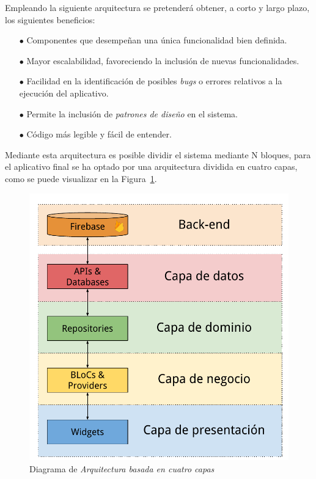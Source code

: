 Empleando la siguiente arquitectura se pretenderá obtener, a corto y largo plazo,  los siguientes beneficios:

\begin{itemize}
  \item[$\bullet$] Componentes que desempeñan una única funcionalidad bien definida.
  \item[$\bullet$] Mayor escalabilidad, favoreciendo la inclusión de nuevas funcionalidades.
  \item[$\bullet$] Facilidad en la identificación de posibles \textit{bugs} o errores relativos a la
  ejecución del aplicativo.
  \item[$\bullet$] Permite la inclusión de \textit{patrones de diseño} en el sistema.
  \item[$\bullet$] Código más legible y fácil de entender.
\end{itemize}

Mediante esta arquitectura es posible dividir el sistema mediante N bloques, para el aplicativo final se ha optado por una
arquitectura dividida en cuatro capas, como se puede visualizar en la Figura~\ref{fig:architecture1}.

\begin{figure}[H]
  \centering
  \includegraphics[scale=0.8]{images/architecture.pdf}
  \caption{Diagrama de \textit{Arquitectura basada en cuatro capas}}
  \label{fig:architecture1}
\end{figure}

